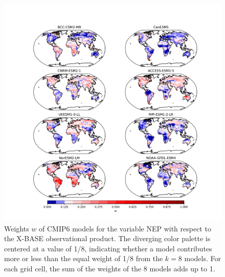 \documentclass[gmd, manuscript]{copernicus}
\begin{document}
\clearpage 

\begin{figure}[htbp]
   \centering
   \includegraphics[width=14cm, trim={3cm, 1cm, 2.5cm, 1cm}, clip]{Figures/CMIP6_FLUXCOM_weights.pdf} %
   \caption{Weights $w$ of CMIP6 models for the variable NEP with respect to the X-BASE observational product. The diverging color palette is centered at a value of 1/8,  indicating whether a model contributes more or less than the equal weight of 1/8 from the $k= 8$ models. For each grid cell, the sum of the weights of the 8 models adds up to 1. }
   \label{fig:wFluxcom}
\end{figure}
\end{document}
